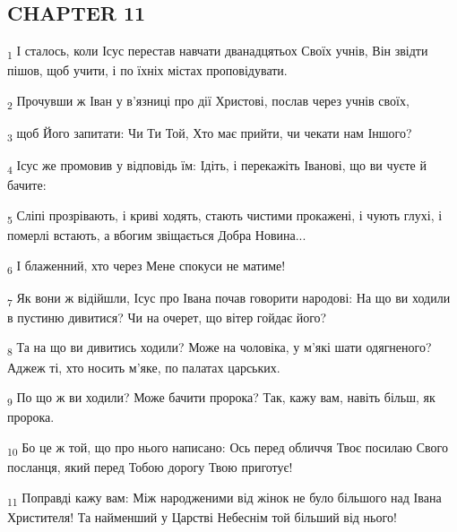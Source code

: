 \subsection{CHAPTER 11}
\begin{tcolorbox}
\textsubscript{1} І сталось, коли Ісус перестав навчати дванадцятьох Своїх учнів, Він звідти пішов, щоб учити, і по їхніх містах проповідувати.
\end{tcolorbox}
\begin{tcolorbox}
\textsubscript{2} Прочувши ж Іван у в'язниці про дії Христові, послав через учнів своїх,
\end{tcolorbox}
\begin{tcolorbox}
\textsubscript{3} щоб Його запитати: Чи Ти Той, Хто має прийти, чи чекати нам Іншого?
\end{tcolorbox}
\begin{tcolorbox}
\textsubscript{4} Ісус же промовив у відповідь їм: Ідіть, і перекажіть Іванові, що ви чуєте й бачите:
\end{tcolorbox}
\begin{tcolorbox}
\textsubscript{5} Сліпі прозрівають, і криві ходять, стають чистими прокажені, і чують глухі, і померлі встають, а вбогим звіщається Добра Новина...
\end{tcolorbox}
\begin{tcolorbox}
\textsubscript{6} І блаженний, хто через Мене спокуси не матиме!
\end{tcolorbox}
\begin{tcolorbox}
\textsubscript{7} Як вони ж відійшли, Ісус про Івана почав говорити народові: На що ви ходили в пустиню дивитися? Чи на очерет, що вітер гойдає його?
\end{tcolorbox}
\begin{tcolorbox}
\textsubscript{8} Та на що ви дивитись ходили? Може на чоловіка, у м'які шати одягненого? Аджеж ті, хто носить м'яке, по палатах царських.
\end{tcolorbox}
\begin{tcolorbox}
\textsubscript{9} По що ж ви ходили? Може бачити пророка? Так, кажу вам, навіть більш, як пророка.
\end{tcolorbox}
\begin{tcolorbox}
\textsubscript{10} Бо це ж той, що про нього написано: Ось перед обличчя Твоє посилаю Свого посланця, який перед Тобою дорогу Твою приготує!
\end{tcolorbox}
\begin{tcolorbox}
\textsubscript{11} Поправді кажу вам: Між народженими від жінок не було більшого над Івана Христителя! Та найменший у Царстві Небеснім той більший від нього!
\end{tcolorbox}
